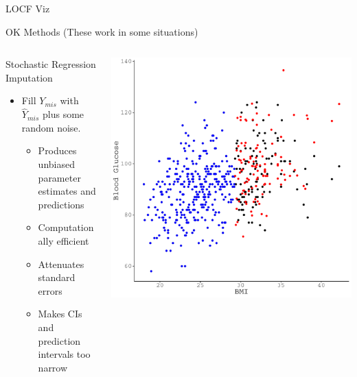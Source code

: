 \documentclass{beamer}\usepackage[]{graphicx}\usepackage[]{color}
\makeatletter
\def\maxwidth{ %
  \ifdim\Gin@nat@width>\linewidth
    \linewidth
  \else
    \Gin@nat@width
  \fi
}
\newenvironment{knitrout}{}{} %
\makeatother
\begin{document}

\begin{frame}{LOCF Viz}
  
\end{frame}


\begin{frame}{OK Methods (These work in some situations)}
  
  \begin{columns}
    \begin{column}{0.5\textwidth}
      
      Stochastic Regression Imputation
      \vc
      \begin{itemize}
      \item Fill $Y_{mis}$ with $\widehat{Y}_{mis}$ plus some random noise.
        \vc
        \begin{itemize}
        \item Produces unbiased parameter estimates and predictions
          \vc
        \item Computationally efficient
          \vc
        \item Attenuates standard errors
          \vc
        \item Makes CIs and prediction intervals too narrow
        \end{itemize}
      \end{itemize}
      
    \end{column}
    \begin{column}{0.5\textwidth}
      
\begin{knitrout}\footnotesize
{}\color{fgcolor}

{\centering \includegraphics[width=\maxwidth]{figure/intro-unnamed-chunk-25-1} 

}
\end{knitrout}
\end{column}
\end{columns}
\end{frame}
\end{document}
